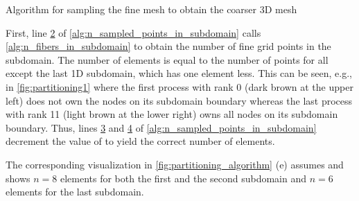 \begin{algorithm}
  \caption{Algorithm for sampling the fine mesh to obtain the coarser 3D mesh}%
  \label{alg:n_sampled_points_in_subdomain}%
\end{algorithm}%

First, line \hyperlink{alg:4.2}{2} of \cref{alg:n_sampled_points_in_subdomain} calls \cref{alg:n_fibers_in_subdomain} to obtain the number of fine grid points in the subdomain. The number of elements  is equal to the number of points for all except the last 1D subdomain, which has one element less. This can be seen, e.g., in \cref{fig:partitioning1} where the first process with rank 0 (dark brown at the upper left) does not own the nodes on its subdomain boundary whereas the last process with rank 11 (light brown at the lower right) owns all nodes on its subdomain boundary.
Thus, lines \hyperlink{alg:4.3}{3} and \hyperlink{alg:4.4}{4} of \cref{alg:n_sampled_points_in_subdomain} decrement the value of  to yield the correct number of elements. 

The corresponding visualization in \cref{fig:partitioning_algorithm} (e) assumes  and shows $n=8$ elements for both the first and the second subdomain and $n=6$ elements for the last subdomain. 

